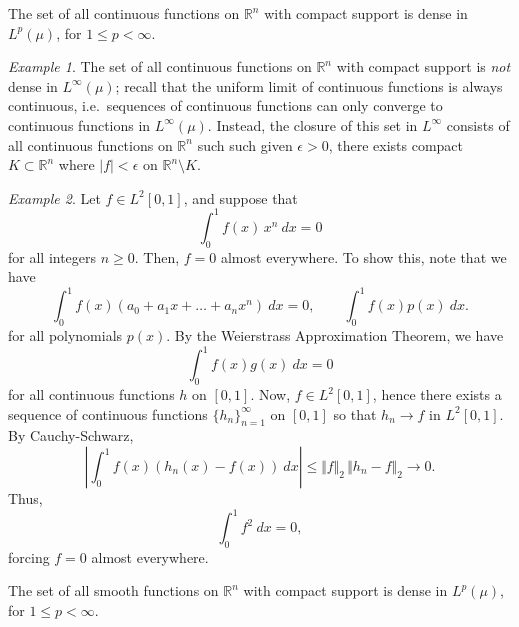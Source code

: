 \documentclass[11pt]{article}
\newcommand{\R}{\mathbb{R}}
\newcommand{\norm}[1]{\Vert #1 \Vert}
\theoremstyle{definition}
\theoremstyle{remark}
\newtheorem*{example}{Example}
\numberwithin{equation}{section}
\begin{document}
    \begin{theorem}
        The set of all continuous functions on $\R^n$ with compact support is dense
        in $L^p(\mu)$, for $1 \leq p < \infty$.
    \end{theorem}
    \begin{example}
        The set of all continuous functions on $\R^n$ with compact support is
        \emph{not} dense in $L^\infty(\mu)$; recall that the uniform limit of
        continuous functions is always continuous, i.e.\ sequences of continuous
        functions can only converge to continuous functions in $L^\infty(\mu)$.
        Instead, the closure of this set in $L^\infty$ consists of all continuous
        functions on $\R^n$ such such given $\epsilon > 0$, there exists compact $K
        \subset \R^n$ where $|f| < \epsilon$ on $\R^n\setminus K$.
    \end{example}

    \begin{example}
        Let $f \in L^2[0, 1]$, and suppose that \[
            \int_0^1 f(x)\, x^n\:dx = 0
        \] for all integers $n \geq 0$. Then, $f = 0$ almost everywhere. To show
        this, note that we have \[
            \int_0^1 f(x)(a_0 + a_1x + \dots + a_nx^n)\:dx = 0, \qquad
            \int_0^1 f(x)p(x)\:dx.
        \] for all polynomials $p(x)$. By the Weierstrass Approximation Theorem, we
        have \[
            \int_0^1 f(x) g(x)\:dx = 0
        \] for all continuous functions $h$ on $[0, 1]$. Now, $f \in L^2[0, 1]$,
        hence there exists a sequence of continuous functions $\{h_n\}_{n =
        1}^\infty$ on $[0, 1]$ so that $h_n \to f$ in $L^2[0, 1]$. By Cauchy-Schwarz,
        \[
            \left|\int_0^1 f(x)(h_n(x) - f(x))\:dx\right| \leq \norm{f}_2\, \norm{h_n
            - f}_2 \to 0.
        \] Thus, \[
            \int_0^1 f^2\:dx = 0,
        \] forcing $f = 0$ almost everywhere.
    \end{example}

    \begin{theorem}
        The set of all smooth functions on $\R^n$ with compact support is dense in
        $L^p(\mu)$, for $1 \leq p < \infty$.
    \end{theorem}
\end{document}
